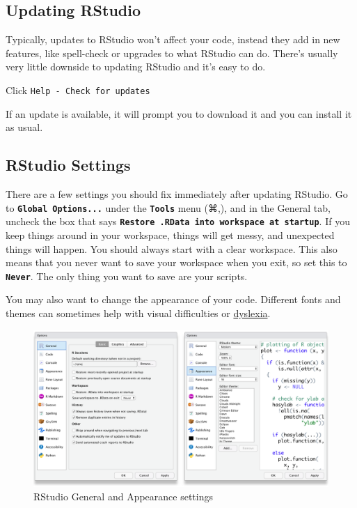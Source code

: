 \documentclass[
  oneside]{book}
\begin{document}
\hypertarget{updating-rstudio}{%
\subsection{Updating RStudio}\label{updating-rstudio}}

Typically, updates to RStudio won't affect your code, instead they add in new features, like spell-check or upgrades to what RStudio can do. There's usually very little downside to updating RStudio and it's easy to do.

Click \texttt{Help\ -\ Check\ for\ updates}

If an update is available, it will prompt you to download it and you can install it as usual.

\hypertarget{rstudio-settings}{%
\subsection{RStudio Settings}\label{rstudio-settings}}

There are a few settings you should fix immediately after updating RStudio. Go to \textbf{\texttt{Global\ Options...}} under the \textbf{\texttt{Tools}} menu (⌘,), and in the General tab, uncheck the box that says \textbf{\texttt{Restore\ .RData\ into\ workspace\ at\ startup}}. If you keep things around in your workspace, things will get messy, and unexpected things will happen. You should always start with a clear workspace. This also means that you never want to save your workspace when you exit, so set this to \textbf{\texttt{Never}}. The only thing you want to save are your scripts.

You may also want to change the appearance of your code. Different fonts and themes can sometimes help with visual difficulties or \href{https://datacarpentry.org/blog/2017/09/coding-and-dyslexia}{dyslexia}.

\begin{figure}

{\centering \includegraphics[width=1\linewidth]{images/rstudio_settings_general_appearance} 

}

\caption{RStudio General and Appearance settings}\label{fig:settings-general}
\end{figure}
\end{document}
